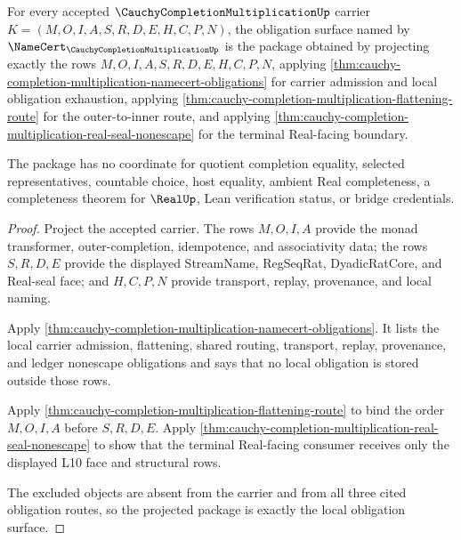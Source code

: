 \begin{theorem}
\label{thm:cauchy-completion-multiplication-obligation-closure-package}
For every accepted $\CauchyCompletionMultiplicationUp$ carrier $K=(M,O,I,A,S,R,D,E,H,C,P,N)$, the obligation surface named by $\NameCert_{\CauchyCompletionMultiplicationUp}$ is the package obtained by projecting exactly the rows $M,O,I,A,S,R,D,E,H,C,P,N$, applying \autoref{thm:cauchy-completion-multiplication-namecert-obligations} for carrier admission and local obligation exhaustion, applying \autoref{thm:cauchy-completion-multiplication-flattening-route} for the outer-to-inner route, and applying \autoref{thm:cauchy-completion-multiplication-real-seal-nonescape} for the terminal Real-facing boundary.

The package has no coordinate for quotient completion equality, selected representatives, countable choice, host equality, ambient Real completeness, a completeness theorem for $\RealUp$, Lean verification status, or bridge credentials.
\end{theorem}
\begin{proof}
Project the accepted carrier. The rows $M,O,I,A$ provide the monad transformer, outer-completion, idempotence, and associativity data; the rows $S,R,D,E$ provide the displayed StreamName, RegSeqRat, DyadicRatCore, and Real-seal face; and $H,C,P,N$ provide transport, replay, provenance, and local naming.

Apply \autoref{thm:cauchy-completion-multiplication-namecert-obligations}. It lists the local carrier admission, flattening, shared routing, transport, replay, provenance, and ledger nonescape obligations and says that no local obligation is stored outside those rows.

Apply \autoref{thm:cauchy-completion-multiplication-flattening-route} to bind the order $M,O,I,A$ before $S,R,D,E$. Apply \autoref{thm:cauchy-completion-multiplication-real-seal-nonescape} to show that the terminal Real-facing consumer receives only the displayed L10 face and structural rows.

The excluded objects are absent from the carrier and from all three cited obligation routes, so the projected package is exactly the local obligation surface.
\end{proof}

